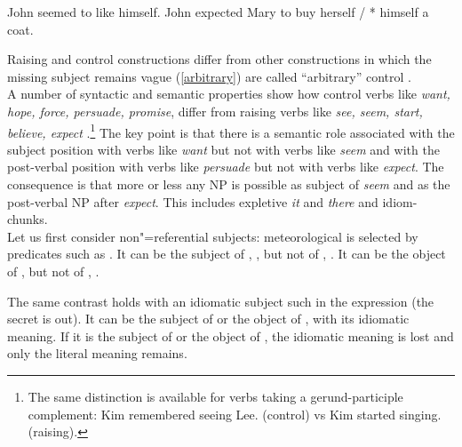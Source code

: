\documentclass[output=paper
	        ,collection
	        ,collectionchapter
 	        ,biblatex
                ,babelshorthands
                ,newtxmath
                ,draftmode
                ,colorlinks, citecolor=brown
]{./langsci/langscibook}
\begin{document}
\begin{exe}
	\ex \begin{xlist}
	\ex John seemed to like himself.\label{seem}
\ex  John expected Mary to buy herself / * himself a coat. \label{exp}
\end{xlist}
 \end{exe}
 
 Raising and control constructions differ from other constructions in which the missing subject remains vague (\ref{arbitrary}) are called ``arbitrary'' control \citep{Bresnan1982}.\\

 A number of syntactic and semantic properties show how control verbs like \emph{want, hope, force, persuade, promise}, differ from raising verbs like \emph{see, seem, start, believe, expect} \citep{Rosenbaum67a-u,Postal1974,Bresnan1982}.\footnote{The same distinction is available for verbs taking a gerund-participle complement:
Kim remembered seeing Lee. (control) vs  Kim started singing. (raising).}
 The key point is that there is a semantic role associated with the subject position with verbs like \emph{want} but not with verbs like \emph{seem} and with the post-verbal position with verbs like \emph{persuade} but not with verbs like \emph{expect}.  The consequence is that more or less any NP is possible as subject of \emph{seem} and as the post-verbal NP after \emph{expect}. This includes expletive \emph{it} and \emph{there} and idiom-chunks. \\
 Let us first consider non"=referential subjects: meteorological  is selected
 by predicates such as . It can be the subject of , , but not of
 , . It can be the object of ,  but not of , .
	
\eal
{}
 \label{rain1}
 \label{rain2}
\zl
\eal
{} \label{rain3}
 \label{rain4}
\zl
 	
 The same contrast holds with an idiomatic subject such  in the expression  (the secret is out). It can be the subject of  or the object of , with its idiomatic meaning. If it is the subject of  or the object of , the idiomatic meaning is lost and only the literal meaning remains.
 
\end{document}
